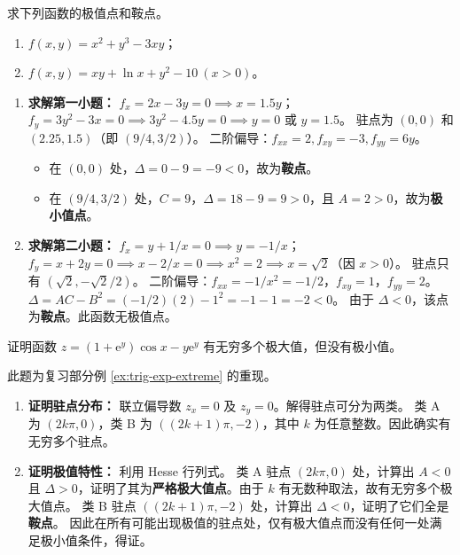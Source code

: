 \documentclass[lang=cn,11pt]{elegantbook}
\begin{document}
\begin{exercise}[极值点与鞍点的求解]
求下列函数的极值点和鞍点。
\begin{enumerate}
    \item[(1)] $f(x,y)=x^2+y^3-3xy$；
    \item[(2)] $f(x,y)=xy+\ln x+y^2-10\ (x>0)$。
\end{enumerate}
\end{exercise}
\begin{solution}
\begin{enumerate}
  \item[(1)] \textbf{求解第一小题：}
  $f_x = 2x-3y = 0 \implies x=1.5y$；$f_y = 3y^2-3x = 0 \implies 3y^2 - 4.5y = 0 \implies y=0$ 或 $y=1.5$。
  驻点为 $(0,0)$ 和 $(2.25, 1.5)$（即 $(9/4, 3/2)$）。
  二阶偏导：$f_{xx} = 2, f_{xy} = -3, f_{yy} = 6y$。
  \begin{itemize}
    \item 在 $(0,0)$ 处，$\Delta = 0 - 9 = -9 < 0$，故为\textbf{鞍点}。
    \item 在 $(9/4, 3/2)$ 处，$C = 9$，$\Delta = 18 - 9 = 9 > 0$，且 $A = 2 > 0$，故为\textbf{极小值点}。
  \end{itemize}

  \item[(2)] \textbf{求解第二小题：}
  $f_x = y + 1/x = 0 \implies y = -1/x$；$f_y = x + 2y = 0 \implies x - 2/x = 0 \implies x^2=2 \implies x=\sqrt{2}$（因 $x>0$）。
  驻点只有 $(\sqrt{2}, -\sqrt{2}/2)$。
  二阶偏导：$f_{xx} = -1/x^2 = -1/2$，$f_{xy} = 1$，$f_{yy} = 2$。
  $\Delta = AC - B^2 = (-1/2)(2) - 1^2 = -1 - 1 = -2 < 0$。
  由于 $\Delta < 0$，该点为\textbf{鞍点}。此函数无极值点。
\end{enumerate}
\end{solution}

\begin{exercise}[超越函数的极值特性证明]
证明函数 $z=(1+\mathrm{e}^y)\cos x-y\mathrm{e}^y$ 有无穷多个极大值，但没有极小值。
\end{exercise}
\begin{solution}
此题为复习部分例 \ref{ex:trig-exp-extreme} 的重现。
\begin{enumerate}
  \item \textbf{证明驻点分布：} 联立偏导数 $z_x=0$ 及 $z_y=0$。解得驻点可分为两类。
  类 A 为 $(2k\pi, 0)$，类 B 为 $((2k+1)\pi, -2)$，其中 $k$ 为任意整数。因此确实有无穷多个驻点。
  \item \textbf{证明极值特性：} 利用 Hesse 行列式。
  类 A 驻点 $(2k\pi, 0)$ 处，计算出 $A < 0$ 且 $\Delta > 0$，证明了其为\textbf{严格极大值点}。由于 $k$ 有无数种取法，故有无穷多个极大值点。
  类 B 驻点 $((2k+1)\pi, -2)$ 处，计算出 $\Delta < 0$，证明了它们全是\textbf{鞍点}。
  因此在所有可能出现极值的驻点处，仅有极大值点而没有任何一处满足极小值条件，得证。
\end{enumerate}
\end{solution}
\end{document}
